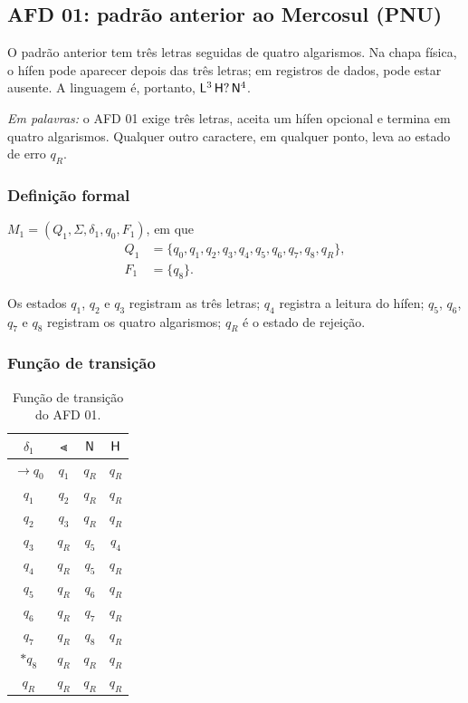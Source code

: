 \subsection{AFD 01: padrão anterior ao Mercosul (PNU)}

O padrão anterior tem três letras seguidas de quatro algarismos. Na
chapa física, o hífen pode aparecer depois das três letras; em
registros de dados, pode estar ausente. A linguagem é, portanto,
$\mathsf{L}^3\,\mathsf{H}?\,\mathsf{N}^4$.

\emph{Em palavras:} o AFD 01 exige três letras, aceita um hífen
opcional e termina em quatro algarismos. Qualquer outro
caractere, em qualquer ponto, leva ao estado de erro $q_R$.

\subsubsection{Definição formal}

$M_1 = (Q_1, \Sigma, \delta_1, q_0, F_1)$, em que
\begin{align*}
  Q_1 &= \{q_0, q_1, q_2, q_3, q_4, q_5, q_6, q_7, q_8, q_R\},\\
  F_1 &= \{q_8\}.
\end{align*}

Os estados $q_1$, $q_2$ e $q_3$ registram as três letras; $q_4$
registra a leitura do hífen; $q_5$, $q_6$, $q_7$ e $q_8$ registram os
quatro algarismos; $q_R$ é o estado de rejeição.

\subsubsection{Função de transição}

\begin{table}[ht]
\centering
\begin{tabular}{cccc}
\toprule
$\delta_1$ & $\Lt$ & $\mathsf{N}$ & $\mathsf{H}$ \\
\midrule
$\to q_0$ & $q_1$ & $q_R$ & $q_R$ \\
$q_1$     & $q_2$ & $q_R$ & $q_R$ \\
$q_2$     & $q_3$ & $q_R$ & $q_R$ \\
$q_3$     & $q_R$ & $q_5$ & $q_4$ \\
$q_4$     & $q_R$ & $q_5$ & $q_R$ \\
$q_5$     & $q_R$ & $q_6$ & $q_R$ \\
$q_6$     & $q_R$ & $q_7$ & $q_R$ \\
$q_7$     & $q_R$ & $q_8$ & $q_R$ \\
$* q_8$   & $q_R$ & $q_R$ & $q_R$ \\
$q_R$     & $q_R$ & $q_R$ & $q_R$ \\
\bottomrule
\end{tabular}
\caption{Função de transição do AFD 01.}
\label{tab:delta1}
\end{table}

